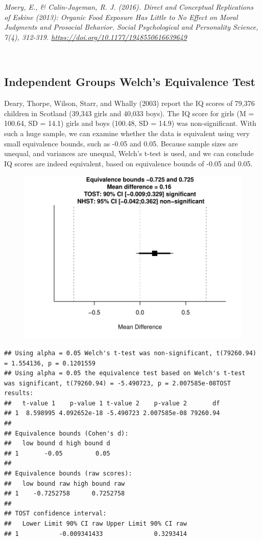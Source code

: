 \documentclass[english,man]{apa6}
\theoremstyle{definition}
\theoremstyle{definition}
\theoremstyle{definition}
\theoremstyle{remark}
\begin{document}
\emph{Moery, E., \& Calin-Jageman, R. J. (2016). Direct and Conceptual
Replications of Eskine (2013): Organic Food Exposure Has Little to No
Effect on Moral Judgments and Prosocial Behavior. Social Psychological
and Personality Science, 7(4), 312-319.
\url{https://doi.org/10.1177/1948550616639649} }

~

\subsection{Independent Groups Welch's Equivalence
Test}\label{independent-groups-welchs-equivalence-test}

Deary, Thorpe, Wilson, Starr, and Whally (2003) report the IQ scores of
79,376 children in Scotland (39,343 girls and 40,033 boys). The IQ score
for girls (M = 100.64, SD = 14.1) girls and boys (100.48, SD = 14.9) was
non-significant. With such a huge sample, we can examine whether the
data is equivalent using very small equivalence bounds, such as -0.05
and 0.05. Because sample sizes are unequal, and variances are unequal,
Welch's t-test is used, and we can conclude IQ scores are indeed
equivalent, based on equivalence bounds of -0.05 and 0.05.

\begin{figure}[htbp]
\centering
\includegraphics{manuscript_files/figure-latex/unnamed-chunk-7-1.pdf}
\caption{}
\end{figure}

\begin{verbatim}
## Using alpha = 0.05 Welch's t-test was non-significant, t(79260.94) = 1.554136, p = 0.1201559
## Using alpha = 0.05 the equivalence test based on Welch's t-test  was significant, t(79260.94) = -5.490723, p = 2.007585e-08TOST results:
##   t-value 1    p-value 1 t-value 2    p-value 2       df
## 1  8.598995 4.092652e-18 -5.490723 2.007585e-08 79260.94
## 
## Equivalence bounds (Cohen's d):
##   low bound d high bound d
## 1       -0.05         0.05
## 
## Equivalence bounds (raw scores):
##   low bound raw high bound raw
## 1    -0.7252758      0.7252758
## 
## TOST confidence interval:
##   Lower Limit 90% CI raw Upper Limit 90% CI raw
## 1           -0.009341433              0.3293414
\end{verbatim}
\end{document}
